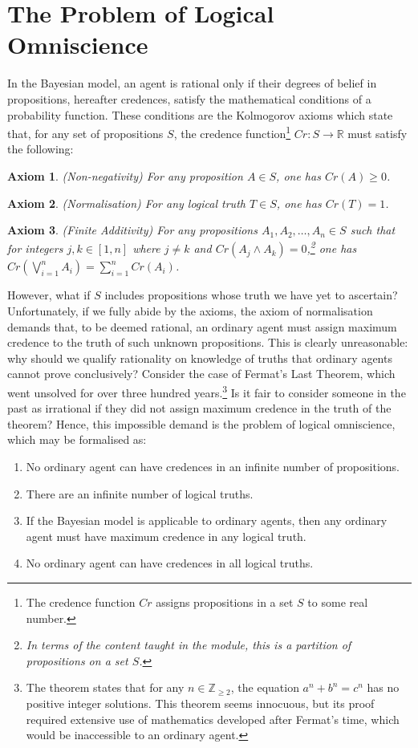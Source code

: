 \documentclass[12pt]{article}
\newtheorem{axiom}{Axiom}
\begin{document}
\section{The Problem of Logical Omniscience}
In the Bayesian model, an agent is rational only if their degrees of belief in propositions, hereafter credences, satisfy the mathematical conditions of a probability function.\autocite[13]{bdrc} These conditions are the Kolmogorov axioms which state that, for any set of propositions $S$, the credence function\footnote{The credence function $Cr$ assigns propositions in a set $S$ to some real number.} $Cr:S\rightarrow\mathbb{R}$ must satisfy the following:
\begin{axiom}
    (Non-negativity) For any proposition $A\in S$, one has $Cr(A)\geq0$.
\end{axiom}
\begin{axiom}
    (Normalisation) For any logical truth $T\in S$, one has $Cr(T)=1$.
\end{axiom}
\begin{axiom}
    (Finite Additivity) For any propositions $A_1, A_2,\dots, A_n\in S$ such that for integers $j,k\in[1,n]$ where $j\neq k$ and $Cr(A_j\land A_k)=0$,\footnote{In terms of the content taught in the module, this is a partition of propositions on a set $S$.} one has $Cr(\bigvee_{i=1}^{n}A_i)=\sum_{i=1}^{n}Cr(A_i)$.
\end{axiom}
However, what if $S$ includes propositions whose truth we have yet to ascertain? Unfortunately, if we fully abide by the axioms, the axiom of normalisation demands that, to be deemed rational, an ordinary agent must assign maximum credence to the truth of such unknown propositions. This is clearly unreasonable: why should we qualify rationality on knowledge of truths that ordinary agents cannot prove conclusively? Consider the case of Fermat's Last Theorem, which went unsolved for over three hundred years.\footnote{The theorem states that for any $n\in\mathbb{Z}_{\geq2}$, the equation $a^n+b^n=c^n$ has no positive integer solutions. This theorem seems innocuous, but its proof required extensive use of mathematics developed after Fermat's time, which would be inaccessible to an ordinary agent.} Is it fair to consider someone in the past as irrational if they did not assign maximum credence in the truth of the theorem?\autocite[108]{dogramaci} Hence, this impossible demand is the problem of logical omniscience, which may be formalised as:\autocite{youtube}
\begin{enumerate}[label=\textbf{P\arabic*:},leftmargin=0.5in]
    \item No ordinary agent can have credences in an infinite number of propositions.
    \item There are an infinite number of logical truths.
    \item If the Bayesian model is applicable to ordinary agents, then any ordinary agent must have maximum credence in any logical truth.
    \item No ordinary agent can have credences in all logical truths.
\end{enumerate}
\end{document}
